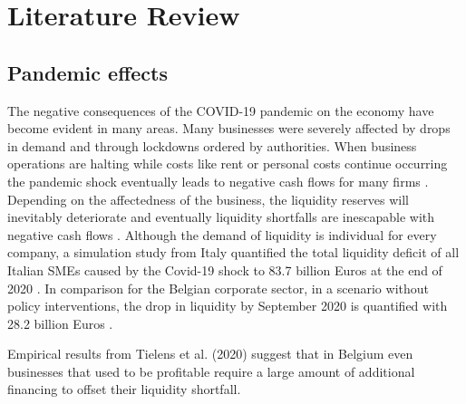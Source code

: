 
\chapter{Literature Review} %

\label{Chapter2} %


\section{Pandemic effects}

The negative consequences of the COVID-19 pandemic on the economy have become evident in many areas. Many businesses were severely affected by drops in demand and through lockdowns ordered by authorities. When business operations are halting while costs like rent or personal costs continue occurring the pandemic shock eventually leads to negative cash flows for many firms \parencite{fernandez-cerezo_firm-level_2021}.
Depending on the affectedness of the business, the liquidity reserves will inevitably deteriorate and eventually liquidity shortfalls are inescapable with negative cash flows \parencite{puhr_have_2021}.
Although the demand of liquidity is individual for every company, a simulation study from Italy quantified the total liquidity deficit of all Italian SMEs caused by the Covid-19 shock to 83.7 billion Euros at the end of 2020 \parencite{bellucci_consequences_2022}. 
In comparison for the Belgian corporate sector, in a scenario without policy interventions, the drop in liquidity by September 2020 is quantified with 28.2 billion Euros \parencite{tielens_belgian_2020}. 

Empirical results from Tielens et al. (2020) suggest that in Belgium even businesses that used to be profitable require a large amount of additional financing to offset their liquidity shortfall.

